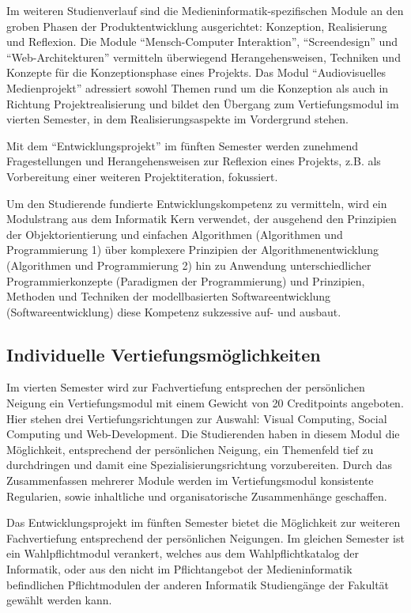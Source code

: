 Im weiteren Studienverlauf sind die Medieninformatik-spezifischen Module
an den groben Phasen der Produktentwicklung ausgerichtet: Konzeption,
Realisierung und Reflexion. Die Module ``Mensch-Computer Interaktion'',
``Screendesign'' und ``Web-Architekturen'' vermitteln überwiegend
Herangehensweisen, Techniken und Konzepte für die Konzeptionsphase eines
Projekts. Das Modul ``Audiovisuelles Medienprojekt'' adressiert sowohl
Themen rund um die Konzeption als auch in Richtung Projektrealisierung
und bildet den Übergang zum Vertiefungsmodul im vierten Semester, in dem
Realisierungsaspekte im Vordergrund stehen.

Mit dem ``Entwicklungsprojekt'' im fünften Semester werden zunehmend
Fragestellungen und Herangehensweisen zur Reflexion eines Projekts, z.B.
als Vorbereitung einer weiteren Projektiteration, fokussiert.

Um den Studierende fundierte Entwicklungskompetenz zu vermitteln, wird
ein Modulstrang aus dem Informatik Kern verwendet, der ausgehend den
Prinzipien der Objektorientierung und einfachen Algorithmen (Algorithmen
und Programmierung 1) über komplexere Prinzipien der
Algorithmenentwicklung (Algorithmen und Programmierung 2) hin zu
Anwendung unterschiedlicher Programmierkonzepte (Paradigmen der
Programmierung) und Prinzipien, Methoden und Techniken der
modellbasierten Softwareentwicklung (Softwareentwicklung) diese
Kompetenz sukzessive auf- und ausbaut.

\subsection{Individuelle
Vertiefungsmöglichkeiten\label{/mi-2017/selbstbericht/0400-studiengangskonzept/0000-studiengangskonzept}}\label{individuelle-vertiefungsmuxf6glichkeitenpathlabelmi-2017selbstbericht0400-studiengangskonzept0000-studiengangskonzept}

Im vierten Semester wird zur Fachvertiefung entsprechen der persönlichen
Neigung ein Vertiefungsmodul mit einem Gewicht von 20 Creditpoints
angeboten. Hier stehen drei Vertiefungsrichtungen zur Auswahl: Visual
Computing, Social Computing und Web-Development. Die Studierenden haben
in diesem Modul die Möglichkeit, entsprechend der persönlichen Neigung,
ein Themenfeld tief zu durchdringen und damit eine
Spezialisierungsrichtung vorzubereiten. Durch das Zusammenfassen
mehrerer Module werden im Vertiefungsmodul konsistente Regularien, sowie
inhaltliche und organisatorische Zusammenhänge geschaffen.

Das Entwicklungsprojekt im fünften Semester bietet die Möglichkeit zur
weiteren Fachvertiefung entsprechend der persönlichen Neigungen. Im
gleichen Semester ist ein Wahlpflichtmodul verankert, welches aus dem
Wahlpflichtkatalog der Informatik, oder aus den nicht im Pflichtangebot
der Medieninformatik befindlichen Pflichtmodulen der anderen Informatik
Studiengänge der Fakultät gewählt werden kann.

